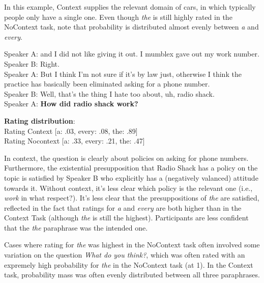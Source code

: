 \documentclass[12pt,letterpaper,table,svgnames,dvipsnames]{article}
\begin{document}
In this example, Context supplies the relevant domain of cars, in which typically people only have a single one. Even though \emph{the} is still highly rated in the NoContext task, note that probability is distributed almost evenly between \emph{a} and \emph{every}. 


\begin{exe}
\ex {}
    \begin{xlist}
    \ex {}
    Speaker A: and I did not like giving it out. I mumblex gave out my work number.\\
    Speaker B: Right.\\
    Speaker A: But I think I'm not sure if it's by law just, otherwise I think the practice has basically been eliminated asking for a phone number.\\
    Speaker B: Well, that's the thing I hate too about, uh, radio shack. \\
    Speaker A: \textbf{How did radio shack work?}
    
    \ex \textbf{Rating distribution}:\\
    Rating Context [a: .03, every: .08, the: .89]\\
    Rating Nocontext [a: .33, every: .21, the: .47]
    \end{xlist}
\end{exe}


In context, the question is clearly about policies on asking for phone numbers. Furthermore, the existential presupposition that Radio Shack has a policy on the topic is satisfied by Speaker B who explicitly has a (negatively valanced) attitude towards it. Without context, it's less clear which policy is the relevant one (i.e., \emph{work} in what respect?). It's less clear that the presuppositions of \emph{the} are satisfied, reflected in the fact that ratings for \emph{a} and \emph{every} are both higher than in the Context Task (although \emph{the} is still the highest). Participants are less confident that the \emph{the} paraphrase was the intended one. 

Cases where rating for \emph{the} was highest in the NoContext task often involved some variation on the question \emph{What do you think?}, which was often rated with an expremely high probability for \emph{the} in the NoContext task (at 1). In the Context task, probability mass was often evenly distributed between all three paraphrases.
\end{document}
